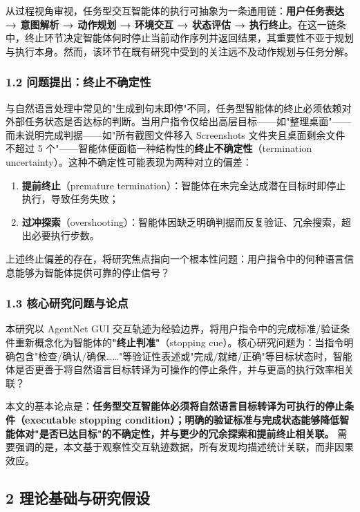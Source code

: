 \documentclass[12pt,a4paper,openany,oneside]{ctexrep}
\begin{document}
从过程视角审视，任务型交互智能体的执行可抽象为一条通用链：\textbf{用户任务表达 → 意图解析 → 动作规划 → 环境交互 → 状态评估 → 执行终止}。在这一链条中，终止环节决定智能体何时停止当前动作序列并返回结果，其重要性不亚于规划与执行本身。然而，该环节在既有研究中受到的关注远不及动作规划与任务分解。

\subsubsection{1.2 问题提出：终止不确定性}


与自然语言处理中常见的"生成到句末即停"不同，任务型智能体的终止必须依赖对外部任务状态是否达标的判断。当用户指令仅给出高层目标——如"整理桌面"——而未说明完成判据——如"所有截图文件移入 Screenshots 文件夹且桌面剩余文件不超过 5 个"——智能体便面临一种结构性的\textbf{终止不确定性}（termination uncertainty）。这种不确定性可能表现为两种对立的偏差：

\begin{enumerate}
\item[1.] \textbf{提前终止}（premature termination）：智能体在未完全达成潜在目标时即停止执行，导致任务失败；
\item[2.] \textbf{过冲探索}（overshooting）：智能体因缺乏明确判据而反复验证、冗余搜索，超出必要执行步数。
\end{enumerate}


上述终止偏差的存在，将研究焦点指向一个根本性问题：用户指令中的何种语言信息能够为智能体提供可靠的停止信号？

\subsubsection{1.3 核心研究问题与论点}


本研究以 AgentNet GUI 交互轨迹为经验边界，将用户指令中的完成标准/验证条件重新概念化为智能体的\textbf{"终止判准"}（stopping cue）。核心研究问题为：当指令明确包含"检查/确认/确保……"等验证性表述或"完成/就绪/正确"等目标状态时，智能体是否更善于将自然语言目标转译为可操作的停止条件，并与更高的执行效率相关联？

本文的基本论点是：\textbf{任务型交互智能体必须将自然语言目标转译为可执行的停止条件（executable stopping condition）；明确的验证标准与完成状态能够降低智能体对"是否已达目标"的不确定性，并与更少的冗余探索和提前终止相关联。} 需要强调的是，本文基于观察性交互轨迹数据，所有发现均描述统计关联，而非因果效应。

\subsection{2 理论基础与研究假设}
\end{document}
